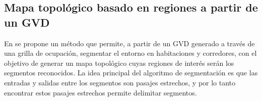 



\subsection{Mapa topológico basado en regiones a partir de un GVD}\label{subsec:mapaTopGVD}
En \cite{Thrun1998} se propone un método que permite, a partir de un GVD generado a través de una grilla de ocupación, segmentar el entorno en habitaciones y corredores, con el objetivo de generar un mapa topológico cuyas regiones de interés serán los segmentos reconocidos. La idea principal del algoritmo de segmentación es que las entradas y salidas entre los segmentos son pasajes estrechos, y por lo tanto encontrar estos pasajes estrechos permite delimitar segmentos.

